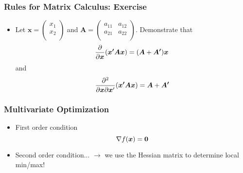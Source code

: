 \documentclass[pdflatex, 12pt]{beamer}
\begin{document}
\begin{frame}
\frametitle{Rules for Matrix Calculus: Exercise}
\begin{itemize}
\item Let $\bm{x} = \begin{pmatrix}
x_1 \\
x_2 \\
\end{pmatrix}$ and $\bm{A} = \begin{pmatrix}
a_{11} & a_{12} \\
a_{21} & a_{22} \\
\end{pmatrix}$. Demonstrate that
 \begin{equation}
 \frac{\partial}{\partial \bm{x}} (\bm{x'Ax}) = (\bm{A} + \bm{A'})\bm{x} \notag
 \end{equation}
and 
 \begin{equation}
 \frac{\partial^2}{\partial \bm{x}\partial \bm{x}'} (\bm{x'Ax}) = \bm{A} + \bm{A'} \notag
 \end{equation}
\end{itemize}
\end{frame}

\begin{frame}
\frametitle{Multivariate Optimization}
\begin{itemize}
\item First order condition
 \begin{equation}
 \nabla f(\bm{x}) = \bm{0} \notag
 \end{equation}
\vspace{0.2cm}
\item Second order condition... $\rightarrow$ we use the Hessian matrix to determine local min/max!
\end{itemize}
\end{frame}
\end{document}
